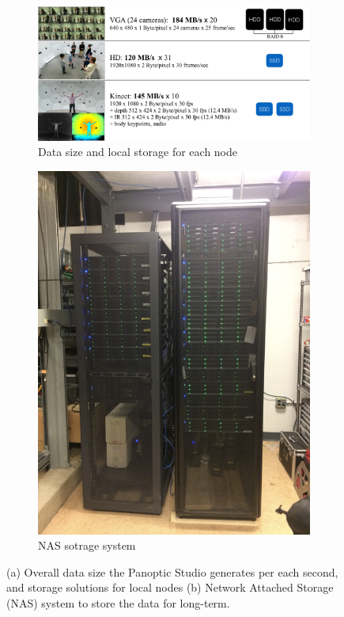 \begin{figure}[t]	
	\centering
	\begin{subfigure}{0.71\textwidth}
		\includegraphics[width=\textwidth]{fig_system/storage}
		\caption{Data size and local storage for each node}
		\label{fig:dome_datasize}
	\end{subfigure}
	\begin{subfigure}{0.27\textwidth}
		\includegraphics[width=\textwidth]{fig_system/dome_NAS}
		\caption{NAS sotrage system}
		\label{fig:dome_NAS}
	\end{subfigure}
	\caption{(a) Overall data size the Panoptic Studio generates per each second, and storage solutions for local nodes (b) Network Attached Storage (NAS) system to store the data for long-term.}
\end{figure}


